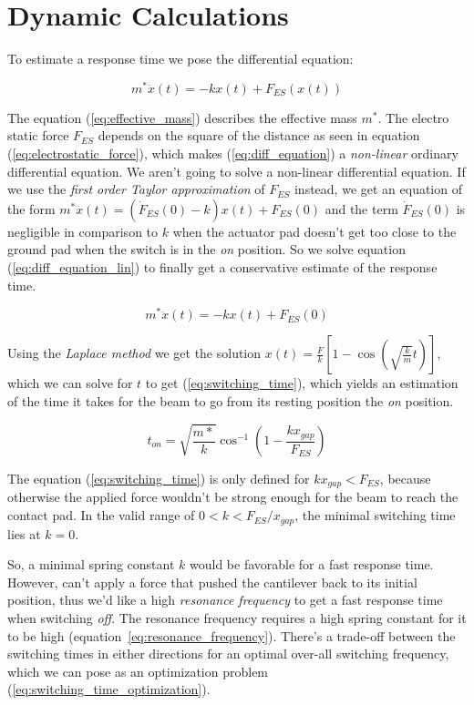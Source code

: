\appendix
\section{Dynamic Calculations}
\label{appendix}

To estimate a response time we pose the differential equation:

\begin{equation}
    m^* \ddot{x}(t) = -kx(t) + F_{ES}(x(t))
    \label{eq:diff_equation}
\end{equation}

The equation (\ref{eq:effective_mass}) describes the effective mass $m^*$.
The electro static force $F_{ES}$ depends on the square of the distance as seen in equation (\ref{eq:electrostatic_force}), which makes (\ref{eq:diff_equation}) a \emph{non-linear} ordinary differential equation.
We aren't going to solve a non-linear differential equation.
If we use the \emph{first order Taylor approximation} of $F_{ES}$ instead, we get an equation of the form $m^* \ddot{x}(t) = (\dot{F}_{ES}(0) - k) x(t) + F_{ES}(0)$ and the term $\dot{F}_{ES}(0)$ is negligible in comparison to $k$ when the actuator pad doesn't get too close to the ground pad when the switch is in the \emph{on} position.
So we solve equation (\ref{eq:diff_equation_lin}) to finally get a conservative estimate of the response time.

\begin{equation}
    m^* \ddot{x}(t) = -kx(t) + F_{ES}(0)
    \label{eq:diff_equation_lin}
\end{equation}

Using the \emph{Laplace method} we get the solution $x(t) = \frac{F}{k}\left[1-\cos{\left(\sqrt{\frac{k}{m}}t\right)}\right]$, which we can solve for $t$ to get (\ref{eq:switching_time}), which yields an estimation of the time it takes for the beam to go from its resting position the \emph{on} position.

\begin{equation}
    t_{on} = \sqrt{\frac{m*}{k}} \cos^{-1}{\left( 1 - \frac{k x_{gap}}{F_{ES}} \right)} 
    \label{eq:switching_time}
\end{equation}

The equation (\ref{eq:switching_time}) is only defined for $k x_{gap} < F_{ES}$, because otherwise the applied force wouldn't be strong enough for the beam to reach the contact pad.
In the valid range of $0 < k < F_{ES}/x_{gap}$, the minimal switching time lies at $k = 0$.

So, a minimal spring constant $k$ would be favorable for a fast response time.
However, can't apply a force that pushed the cantilever back to its initial position, thus we'd like a high \emph{resonance frequency} to get a fast response time when switching \emph{off}.
The resonance frequency requires a high spring constant for it to be high (equation~\ref{eq:resonance_frequency}).
There's a trade-off between the switching times in either directions for an optimal over-all switching frequency, which we can pose as an optimization problem (\ref{eq:switching_time_optimization}).


